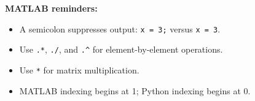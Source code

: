 \documentclass[9pt]{extarticle}
\newcommand{\matlab}[1]{\lstinline[style=code]!#1!}
\begin{document}
\vspace{4pt}
\textbf{MATLAB reminders:}
\begin{itemize}[leftmargin=1.2em,itemsep=0pt,topsep=2pt]
    \item A semicolon suppresses output: \matlab{x = 3;} versus \matlab{x = 3}.
    \item Use \matlab{.*}, \matlab{./}, and \matlab{.^} for element-by-element operations.
    \item Use \matlab{*} for matrix multiplication.
    \item MATLAB indexing begins at 1; Python indexing begins at 0.
\end{itemize}
\end{document}

